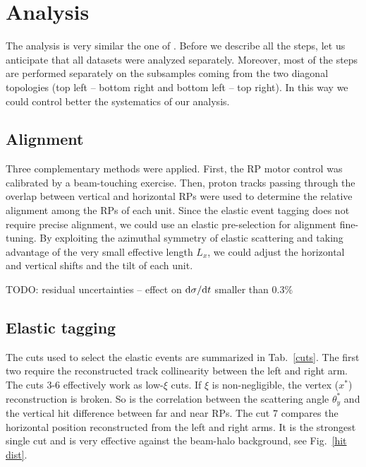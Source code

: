 \documentclass[doublecol]{../macros/epl2}
\def\d{{\rm d}}
\begin{document}
\section{Analysis}

The analysis is very similar the one of \cite{epl96}. Before we describe all the steps, let us anticipate that all datasets were analyzed separately. Moreover, most of the steps are performed separately on the subsamples coming from the two diagonal topologies (top left -- bottom right and bottom left -- top right). In this way we could control better the systematics of our analysis.

\subsection{Alignment}

Three complementary methods were applied. First, the RP motor control was calibrated by a beam-touching exercise. Then, proton tracks passing through the overlap between vertical and horizontal RPs were used to determine the relative alignment among the RPs of each unit. Since the elastic event tagging does not require precise alignment, we could use an elastic pre-selection for alignment fine-tuning. By exploiting the azimuthal symmetry of elastic scattering and taking advantage of the very small effective length $L_x$, we could adjust the horizontal and vertical shifts and the tilt of each unit.

TODO: residual uncertainties -- effect on $\d\sigma/\d t$ smaller than $0.3\%$

\subsection{Elastic tagging}

The cuts used to select the elastic events are summarized in Tab.~\ref{cuts}. The first two require the reconstructed track collinearity between the left and right arm. The cuts 3-6 effectively work as low-$\xi$ cuts. If $\xi$ is non-negligible, the vertex ($x^*$) reconstruction is broken. So is the correlation between the scattering angle $\theta_y^*$ and the vertical hit difference between far and near RPs. The cut 7 compares the horizontal position reconstructed from the left and right arms. It is the strongest single cut and is very effective against the beam-halo background, see Fig.~\ref{hit dist}.
\end{document}
